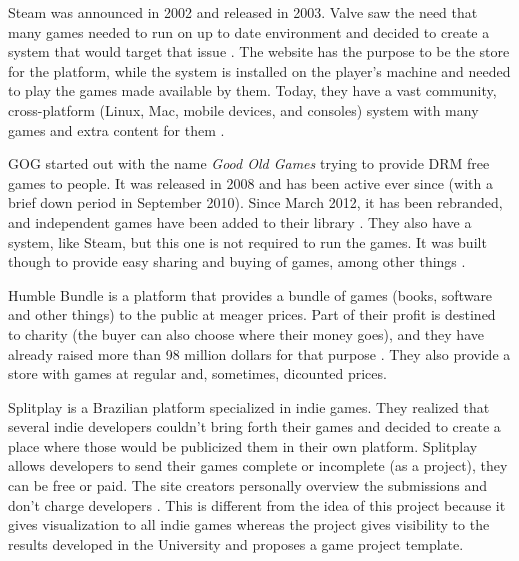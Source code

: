 Steam was announced in 2002 and released in 2003. Valve saw the need that many games needed to run on up to date environment and decided to create a system that would target that issue \cite{wikipedia2017steam}. The website has the purpose to be the store for the platform, while the system is installed on the player's machine and needed to play the games made available by them. Today, they have a vast community, cross-platform (Linux, Mac, mobile devices, and consoles) system with many games and extra content for them \cite{steam2017}.

GOG started out with the name \textit{Good Old Games} trying to provide DRM free games to people. It was released in 2008 and has been active ever since (with a brief down period in September 2010). Since March 2012, it has been rebranded, and independent games have been added to their library \cite{wikipedia2017gog}. They also have a system, like Steam, but this one is not required to run the games. It was built though to provide easy sharing and buying of games, among other things \cite{gog2017}.

Humble Bundle is a platform that provides a bundle of games (books, software and other things) to the public at meager prices. Part of their profit is destined to charity (the buyer can also choose where their money goes), and they have already raised more than 98 million dollars for that purpose \cite{humblebundle2017}. They also provide a store with games at regular and, sometimes, dicounted prices.

Splitplay is a Brazilian platform specialized in indie games. They realized that several indie developers couldn't bring forth their games and decided to create a place where those would be publicized them in their own platform. Splitplay allows developers to send their games complete or incomplete (as a project), they can be free or paid. The site creators personally overview the submissions and don't charge developers \cite{splitplay2017}. This is different from the idea of this project because it gives visualization to all indie games whereas the project gives visibility to the results developed in the University and proposes a game project template.
